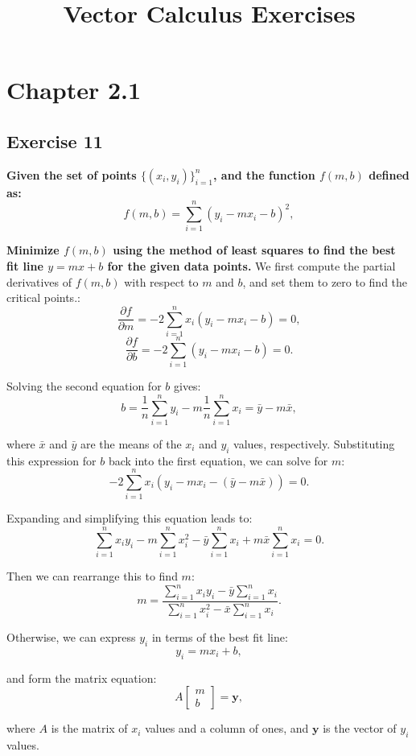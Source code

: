 \documentclass[11pt]{article}
\title{\textbf{Vector Calculus Exercises}}
\author{}
\date{}
\begin{document}
\maketitle

\section*{Chapter 2.1}
\subsection*{Exercise 11}
\textbf{Given the set of points \(\{(x_i, y_i)\}_{i=1}^{n}\), and the function \(f(m, b)\) defined as:}
\[f(m, b) = \sum_{i=1}^{n} (y_i - mx_i - b)^2,\]

\textbf{Minimize \(f(m, b)\) using the method of least squares to find the best fit line \(y = mx + b\) for the given data points.}
\vskip 0.5cm
We first compute the partial derivatives of \(f(m, b)\) with respect to \(m\) and \(b\), and set them to zero to find the critical points.:
\[\frac{\partial f}{\partial m} = -2 \sum_{i=1}^{n} x_i (y_i - mx_i - b) = 0,\]
\[\frac{\partial f}{\partial b} = -2 \sum_{i=1}^{n} (y_i - mx_i - b) = 0.\]

Solving the second equation for \(b\) gives:
\[b = \frac{1}{n} \sum_{i=1}^{n} y_i - m \frac{1}{n} \sum_{i=1}^{n} x_i = \bar{y} - m \bar{x},\]

where \(\bar{x}\) and \(\bar{y}\) are the means of the \(x_i\) and \(y_i\) values, respectively. Substituting this expression for \(b\) back into the first equation, we can solve for \(m\):
\[-2 \sum_{i=1}^{n} x_i (y_i - mx_i - (\bar{y} - m \bar{x})) = 0.\]

Expanding and simplifying this equation leads to:
\[\sum_{i=1}^{n} x_i y_i - m \sum_{i=1}^{n} x_i^2 - \bar{y} \sum_{i=1}^{n} x_i + m \bar{x} \sum_{i=1}^{n} x_i = 0.\]

Then we can rearrange this to find \(m\):
\[m = \frac{\sum_{i=1}^{n} x_i y_i - \bar{y} \sum_{i=1}^{n} x_i}{\sum_{i=1}^{n} x_i^2 - \bar{x} \sum_{i=1}^{n} x_i}.\]

\pagebreak

Otherwise, we can express \(y_i\) in terms of the best fit line:
\[y_i = m x_i + b,\]

and form the matrix equation:
\[ A \begin{bmatrix} m \\ b \end{bmatrix} = \mathbf{y},\]

where \(A\) is the matrix of \(x_i\) values and a column of ones, and \(\mathbf{y}\) is the vector of \(y_i\) values. 
\end{document}
